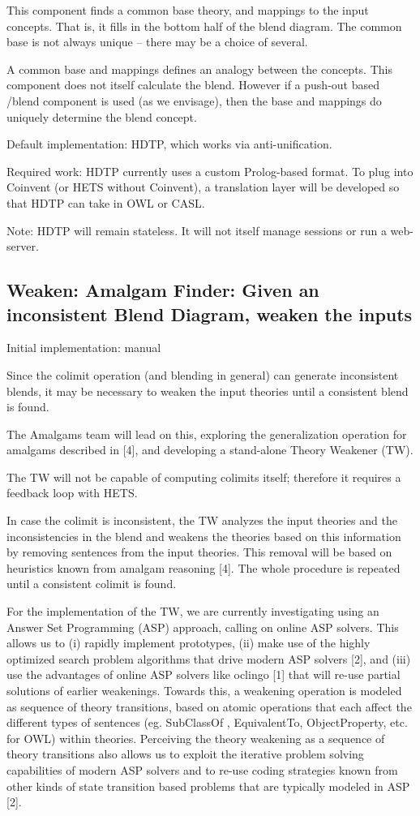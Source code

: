 This component finds a common base theory, and mappings to the input concepts. That is,
it fills in the bottom half of the blend diagram. 
The common base is not always unique -- there may be a choice of several.

A common base and mappings defines an analogy between the concepts. This component does not itself calculate the blend. However if a push-out based /blend component is used (as we envisage), then the base and mappings do uniquely determine the blend concept.

Default implementation: HDTP, which works via anti-unification.

Required work: HDTP currently uses a custom Prolog-based format. To plug into Coinvent (or HETS without Coinvent), a translation layer will be developed so that HDTP can take in OWL or CASL.

Note: HDTP will remain stateless. It will not itself manage sessions or run a web-server.
\subsection{Weaken: Amalgam Finder: Given an inconsistent Blend Diagram, weaken the inputs}


Initial implementation: manual

Since the colimit operation (and blending in general) can generate inconsistent blends, it may be necessary to weaken the input theories until a consistent blend is found. 

The Amalgams team will lead on this, exploring the generalization operation for amalgams described in [4], and developing a stand-alone Theory Weakener (TW).

The TW will not be capable of computing colimits itself; therefore it requires a feedback loop with HETS.

In case the colimit is inconsistent, the TW analyzes the input theories and the inconsistencies
in the blend and weakens the theories based on this information by removing sentences from the
input theories. This removal will be based on heuristics known from amalgam reasoning [4]. The whole procedure is repeated until a consistent colimit is found.

For the implementation of the TW, we are currently investigating using an 
Answer Set Programming (ASP) approach, calling on online ASP solvers. This allows us to (i) rapidly implement prototypes, 
(ii) make use of the highly optimized search problem algorithms that drive modern ASP solvers [2], and (iii) use the advantages of online ASP solvers like oclingo [1] that will re-use partial solutions of earlier weakenings. Towards this, a weakening operation is modeled as sequence of theory transitions, based on atomic operations that each affect the different types of sentences (eg. SubClassOf , EquivalentTo, ObjectProperty, etc. for OWL) within theories. Perceiving the theory weakening as a sequence of theory transitions also allows us to exploit the iterative problem solving capabilities of modern ASP solvers and to re-use coding strategies known from other kinds
of state transition based problems that are typically modeled in ASP [2].

